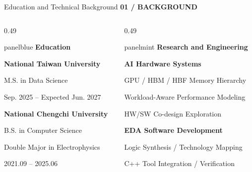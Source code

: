 \documentclass[aspectratio=169,10pt]{beamer}
\newcommand{\smalllabel}[1]{{\scriptsize\bfseries\color{Accent}\MakeUppercase{#1}}}
\begin{document}
\begin{frame}{Education and Technical Background}
  \vspace{0.00cm}
  \smalllabel{01 / Background}\par\vspace{0.12cm}
  \vspace{0.16cm}
  \begin{columns}[T,onlytextwidth]
    \begin{column}{0.49\textwidth}
      \begin{beamercolorbox}[rounded=true,sep=0.21cm,wd=\linewidth]{panelblue}
        {\normalsize\bfseries\color{AccentBlue}Education}\par\vspace{0.15cm}
        {\small\bfseries National Taiwan University}\par
        {\small M.S. in Data Science}\par
        {\scriptsize\color{Muted}Sep. 2025 -- Expected Jun. 2027}\par
        \vspace{0.22cm}
        {\small\bfseries National Chengchi University}\par
        {\small B.S. in Computer Science}\par
        {\small Double Major in Electrophysics}\par
        {\scriptsize\color{Muted}2021.09 -- 2025.06}
      \end{beamercolorbox}
    \end{column}
    \begin{column}{0.49\textwidth}
      \begin{beamercolorbox}[rounded=true,sep=0.21cm,wd=\linewidth]{panelmint}
        {\normalsize\bfseries\color{Accent}Research and Engineering}\par\vspace{0.15cm}
        {\small\bfseries AI Hardware Systems}\par
        {\small GPU / HBM / HBF Memory Hierarchy}\par
        {\small Workload-Aware Performance Modeling}\par
        {\small HW/SW Co-design Exploration}\par
        \vspace{0.20cm}
        {\small\bfseries EDA Software Development}\par
        {\small Logic Synthesis / Technology Mapping}\par
        {\small C++ Tool Integration / Verification}
      \end{beamercolorbox}
    \end{column}
  \end{columns}
  \vspace{0.14cm}
\end{frame}
\end{document}
